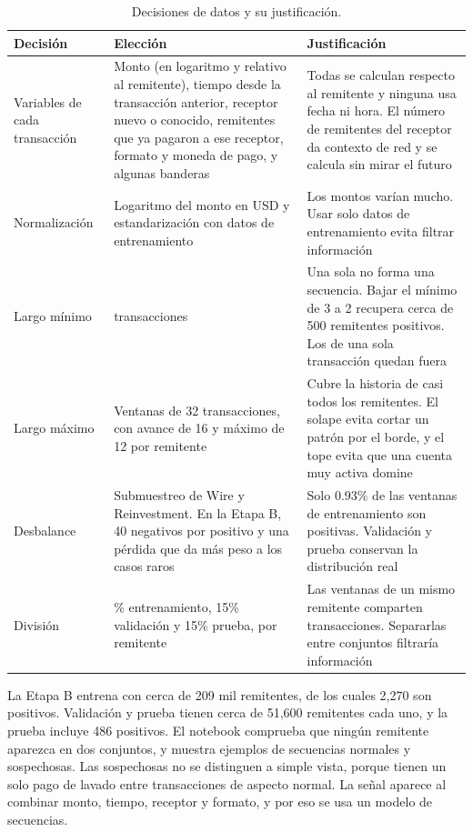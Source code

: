\documentclass[11pt]{article}
\begin{document}
\begin{table}[H]
\centering
\small
\begin{tabular}{>{\raggedright\arraybackslash}p{3cm}>{\raggedright\arraybackslash}p{5.4cm}>{\raggedright\arraybackslash}p{6.6cm}}
\toprule
Decisión & Elección & Justificación \\
\midrule
Variables de cada transacción & Monto (en logaritmo y relativo al remitente), tiempo desde la transacción anterior, receptor nuevo o conocido, remitentes que ya pagaron a ese receptor, formato y moneda de pago, y algunas banderas & Todas se calculan respecto al remitente y ninguna usa fecha ni hora. El número de remitentes del receptor da contexto de red y se calcula sin mirar el futuro \\
Normalización & Logaritmo del monto en USD y estandarización con datos de entrenamiento & Los montos varían mucho. Usar solo datos de entrenamiento evita filtrar información \\
Largo mínimo & 2 transacciones & Una sola no forma una secuencia. Bajar el mínimo de 3 a 2 recupera cerca de 500 remitentes positivos. Los de una sola transacción quedan fuera \\
Largo máximo & Ventanas de 32 transacciones, con avance de 16 y máximo de 12 por remitente & Cubre la historia de casi todos los remitentes. El solape evita cortar un patrón por el borde, y el tope evita que una cuenta muy activa domine \\
Desbalance & Submuestreo de Wire y Reinvestment. En la Etapa B, 40 negativos por positivo y una pérdida que da más peso a los casos raros & Solo 0.93\% de las ventanas de entrenamiento son positivas. Validación y prueba conservan la distribución real \\
División & 70\% entrenamiento, 15\% validación y 15\% prueba, por remitente & Las ventanas de un mismo remitente comparten transacciones. Separarlas entre conjuntos filtraría información \\
\bottomrule
\end{tabular}
\caption{Decisiones de datos y su justificación.}
\end{table}

La Etapa B entrena con cerca de 209 mil remitentes, de los cuales 2,270 son positivos. Validación y prueba tienen cerca de 51,600 remitentes cada uno, y la prueba incluye 486 positivos. El notebook comprueba que ningún remitente aparezca en dos conjuntos, y muestra ejemplos de secuencias normales y sospechosas. Las sospechosas no se distinguen a simple vista, porque tienen un solo pago de lavado entre transacciones de aspecto normal. La señal aparece al combinar monto, tiempo, receptor y formato, y por eso se usa un modelo de secuencias.
\end{document}

